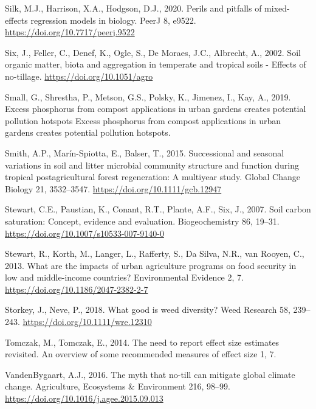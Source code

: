 \documentclass[
  12pt,
]{article}
\newlength{\cslhangindent}
\newlength{\cslentryspacingunit} %
\newenvironment{CSLReferences}[2] %
 {%
  \setlength{\parindent}{0pt}
  \ifodd #1
  \let\oldpar\par
  \def\par{\hangindent=\cslhangindent\oldpar}
  \fi
  \setlength{\parskip}{#2\cslentryspacingunit}
 }%
 {}
\begin{document}
\begin{CSLReferences}{1}{0}
\leavevmode{}%
Silk, M.J., Harrison, X.A., Hodgson, D.J., 2020. Perils and pitfalls of mixed-effects regression models in biology. PeerJ 8, e9522. \url{https://doi.org/10.7717/peerj.9522}

\leavevmode{}%
Six, J., Feller, C., Denef, K., Ogle, S., De Moraes, J.C., Albrecht, A., 2002. Soil organic matter, biota and aggregation in temperate and tropical soils - {Effects} of no-tillage. \url{https://doi.org/10.1051/agro}

\leavevmode{}%
Small, G., Shrestha, P., Metson, G.S., Polsky, K., Jimenez, I., Kay, A., 2019. Excess phosphorus from compost applications in urban gardens creates potential pollution hotspots {Excess} phosphorus from compost applications in urban gardens creates potential pollution hotspots.

\leavevmode{}%
Smith, A.P., Marín-Spiotta, E., Balser, T., 2015. Successional and seasonal variations in soil and litter microbial community structure and function during tropical postagricultural forest regeneration: {A} multiyear study. Global Change Biology 21, 3532--3547. \url{https://doi.org/10.1111/gcb.12947}

\leavevmode{}%
Stewart, C.E., Paustian, K., Conant, R.T., Plante, A.F., Six, J., 2007. Soil carbon saturation: Concept, evidence and evaluation. Biogeochemistry 86, 19--31. \url{https://doi.org/10.1007/s10533-007-9140-0}

\leavevmode{}%
Stewart, R., Korth, M., Langer, L., Rafferty, S., Da Silva, N.R., van Rooyen, C., 2013. What are the impacts of urban agriculture programs on food security in low and middle-income countries? Environmental Evidence 2, 7. \url{https://doi.org/10.1186/2047-2382-2-7}

\leavevmode{}%
Storkey, J., Neve, P., 2018. What good is weed diversity? Weed Research 58, 239--243. \url{https://doi.org/10.1111/wre.12310}

\leavevmode{}%
Tomczak, M., Tomczak, E., 2014. The need to report effect size estimates revisited. {An} overview of some recommended measures of effect size 1, 7.

\leavevmode{}%
VandenBygaart, A.J., 2016. The myth that no-till can mitigate global climate change. Agriculture, Ecosystems \& Environment 216, 98--99. \url{https://doi.org/10.1016/j.agee.2015.09.013}


\end{CSLReferences}
\end{document}
